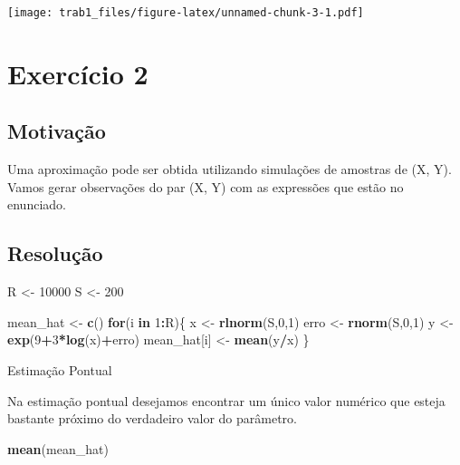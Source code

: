 \documentclass[11pt,]{article}
\newenvironment{Shaded}{\begin{snugshade}}{\end{snugshade}}
\newcommand{\ControlFlowTok}[1]{\textcolor[rgb]{0.13,0.29,0.53}{\textbf{#1}}}
\newcommand{\DecValTok}[1]{\textcolor[rgb]{0.00,0.00,0.81}{#1}}
\newcommand{\KeywordTok}[1]{\textcolor[rgb]{0.13,0.29,0.53}{\textbf{#1}}}
\newcommand{\NormalTok}[1]{#1}
\newcommand{\OperatorTok}[1]{\textcolor[rgb]{0.81,0.36,0.00}{\textbf{#1}}}
\newcommand{\StringTok}[1]{\textcolor[rgb]{0.31,0.60,0.02}{#1}}
\begin{document}
\texttt{[image: trab1\_files/figure-latex/unnamed-chunk-3-1.pdf]}

\newpage

\hypertarget{exercuxedcio-2}{%
\section{Exercício 2}\label{exercuxedcio-2}}

\hypertarget{motivauxe7uxe3o-1}{%
\subsection{Motivação}\label{motivauxe7uxe3o-1}}

Uma aproximação pode ser obtida utilizando simulações de amostras de (X,
Y). Vamos gerar observações do par (X, Y) com as expressões que estão no
enunciado.

\hypertarget{resoluuxe7uxe3o-1}{%
\subsection{Resolução}\label{resoluuxe7uxe3o-1}}

\begin{Shaded}
\begin{Highlighting}[]
\NormalTok{R <-}\StringTok{ }\DecValTok{10000}
\NormalTok{S <-}\StringTok{ }\DecValTok{200}

\NormalTok{mean_hat <-}\StringTok{ }\KeywordTok{c}\NormalTok{()}
\ControlFlowTok{for}\NormalTok{(i }\ControlFlowTok{in} \DecValTok{1}\OperatorTok{:}\NormalTok{R)\{}
\NormalTok{  x <-}\StringTok{ }\KeywordTok{rlnorm}\NormalTok{(S,}\DecValTok{0}\NormalTok{,}\DecValTok{1}\NormalTok{)}
\NormalTok{  erro <-}\StringTok{ }\KeywordTok{rnorm}\NormalTok{(S,}\DecValTok{0}\NormalTok{,}\DecValTok{1}\NormalTok{)}
\NormalTok{  y <-}\StringTok{ }\KeywordTok{exp}\NormalTok{(}\DecValTok{9}\OperatorTok{+}\DecValTok{3}\OperatorTok{*}\KeywordTok{log}\NormalTok{(x)}\OperatorTok{+}\NormalTok{erro)}
\NormalTok{  mean_hat[i] <-}\StringTok{ }\KeywordTok{mean}\NormalTok{(y}\OperatorTok{/}\NormalTok{x)}
\NormalTok{\}}
\end{Highlighting}
\end{Shaded}

Estimação Pontual

Na estimação pontual desejamos encontrar um único valor numérico que
esteja bastante próximo do verdadeiro valor do parâmetro.

\begin{Shaded}
\begin{Highlighting}[]
\KeywordTok{mean}\NormalTok{(mean_hat)}
\end{Highlighting}
\end{Shaded}
\end{document}
